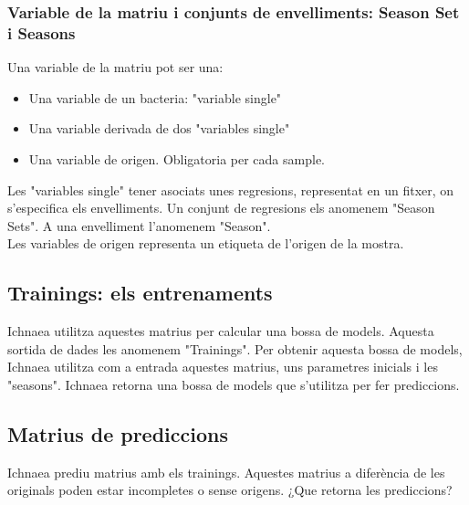 \subsubsection{Variable de la matriu i conjunts de envelliments: Season Set i Seasons}
Una variable de la matriu pot ser una:
\begin{itemize}
\item Una variable de un bacteria: "variable single"
\item Una variable derivada de dos "variables single"
\item Una variable de origen. Obligatoria per cada sample.
\end{itemize}
Les "variables single" tener asociats unes regresions, representat en un fitxer, on s'especifica els envelliments. Un conjunt de regresions els anomenem "Season Sets". A una envelliment l'anomenem "Season".\\

Les variables de origen representa un etiqueta de l'origen de la mostra.\\

\subsection{Trainings: els entrenaments}
Ichnaea utilitza aquestes matrius per calcular una bossa de models. Aquesta sortida de dades les anomenem "Trainings". Per obtenir aquesta bossa de models, Ichnaea utilitza com a entrada aquestes matrius, uns parametres inicials i les "seasons". Ichnaea retorna una bossa de models que s'utilitza per fer prediccions.

\subsection{Matrius de prediccions}
Ichnaea prediu matrius amb els trainings. Aquestes matrius a difer\`{e}ncia de les originals poden estar incompletes o sense origens. ¿Que retorna les prediccions?


